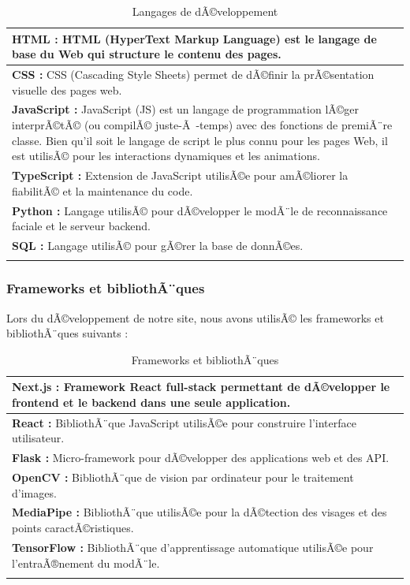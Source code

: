 \renewcommand{\arraystretch}{1.4}
\setlength{\LTleft}{\fill}
\setlength{\LTright}{\fill}
\begin{longtable}{|m{14cm}|}
\hline
\textbf{HTML :} HTML (HyperText Markup Language) est le langage de base du Web qui
structure le contenu des pages.\cite{HTML} \\ \hline
\textbf{CSS :} CSS (Cascading Style Sheets) permet de dÃ©finir la prÃ©sentation visuelle
des pages web.\cite{CSS} \\ \hline
\textbf{JavaScript :} JavaScript (JS) est un langage de programmation lÃ©ger interprÃ©tÃ©
(ou compilÃ© juste-Ã -temps) avec des fonctions de premiÃ¨re classe. Bien qu'il soit le
langage de script le plus connu pour les pages Web, il est utilisÃ© pour les interactions
dynamiques et les animations.\cite{JavaScript} \\ \hline
\textbf{TypeScript :} Extension de JavaScript utilisÃ©e pour amÃ©liorer la fiabilitÃ© et
la maintenance du code.\cite{TypeScript} \\ \hline
\textbf{Python :} Langage utilisÃ© pour dÃ©velopper le modÃ¨le de reconnaissance faciale
et le serveur backend.\cite{Python} \\ \hline
\textbf{SQL :} Langage utilisÃ© pour gÃ©rer la base de donnÃ©es.\cite{SQL} \\ \hline
\caption{Langages de dÃ©veloppement}
\end{longtable}

\subsubsection{Frameworks et bibliothÃ¨ques}

Lors du dÃ©veloppement de notre site, nous avons utilisÃ© les frameworks et bibliothÃ¨ques
suivants :

\begin{longtable}{|m{14cm}|}
\hline
\textbf{Next.js :} Framework React full-stack permettant de dÃ©velopper le frontend et
le backend dans une seule application.\cite{Next.js} \\ \hline
\textbf{React :} BibliothÃ¨que JavaScript utilisÃ©e pour construire l'interface
utilisateur.\cite{React} \\ \hline
\textbf{Flask :} Micro-framework pour dÃ©velopper des applications web et des
API.\cite{Flask} \\ \hline
\textbf{OpenCV :} BibliothÃ¨que de vision par ordinateur pour le traitement
d'images.\cite{OpenCV} \\ \hline
\textbf{MediaPipe :} BibliothÃ¨que utilisÃ©e pour la dÃ©tection des visages et des points
caractÃ©ristiques.\cite{MediaPipe} \\ \hline
\textbf{TensorFlow :} BibliothÃ¨que d'apprentissage automatique utilisÃ©e pour
l'entraÃ®nement du modÃ¨le.\cite{TensorFlow} \\ \hline
\caption{Frameworks et bibliothÃ¨ques}
\end{longtable}

